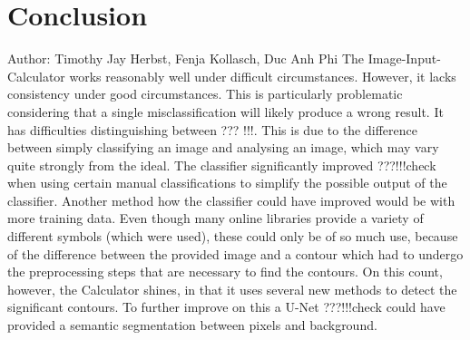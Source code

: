 \documentclass[12pt]{article}
\begin{document}
	\section{Conclusion}
		\small{Author: Timothy Jay Herbst, Fenja Kollasch, Duc Anh Phi} \newline \newline
	The Image-Input-Calculator works reasonably well under difficult circumstances.
	However, it lacks consistency under good circumstances.
	This is particularly problematic considering that a single misclassification will likely produce a wrong result.
	It has difficulties distinguishing between ??? !!!.
	This is due to the difference between simply classifying an image and analysing an image, which may vary quite strongly from the ideal.
	The classifier significantly improved ???!!!check when using certain manual classifications to simplify the possible output of the classifier.
	Another method how the classifier could have improved would be with more training data.
	Even though many online libraries provide a variety of different symbols (which were used), these could only be of so much use, because of the difference between the provided image and a contour which had to undergo the preprocessing steps that are necessary to find the contours.
	On this count, however, the Calculator shines, in that it uses several new methods to detect the significant contours.
	To further improve on this a U-Net ???!!!check could have provided a semantic segmentation between pixels and background.
	
	
	\pagebreak
\end{document}
